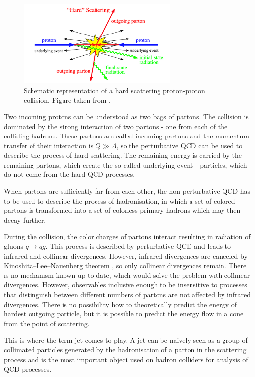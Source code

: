 \begin{figure}[t]
  \centering
  \includegraphics[width=0.7\textwidth]{Chapter2/HardProcess.png}
  \caption{Schematic representation of a hard scattering proton-proton
    collision. Figure taken from \cite{HardProcess}.}
  \label{fig:HardProcess}
\end{figure}

Two incoming protons can be understood as two bags of partons. The collision is
dominated by the strong interaction of two partons - one from each of the
colliding hadrons. These partons are called incoming partons and the
momentum transfer of their interaction is $Q \gg \Lambda$, so the perturbative
QCD can be used to describe the process of hard scattering. The remaining energy
is carried by the remaining partons, which create the so called underlying event -
particles, which do not come from the hard QCD processes.

When partons are sufficiently far from each other, the non-perturbative QCD has to
be used to describe the process of hadronisation, in which a set of colored
partons is transformed into a set of colorless primary hadrons which may then
decay further. 

During the collision, the color charges of partons interact resulting in
radiation of gluons $q \rightarrow qg$. This process is described by
perturbative QCD and leads to infrared and collinear divergences. However,
infrared divergences are
canceled by Kinoshita--Lee--Nauenberg theorem \cite{KLN1,KLN2}, so only
collinear divergences remain. There is no mechanism known up to date, which
would solve the problem with collinear divergences. However, observables
inclusive enough to be insensitive to processes that distinguish between
different numbers of partons are not affected by infrared divergences.
There is no possibility how to theoretically predict the energy of hardest
outgoing particle, but it is possible to predict the energy flow in a cone from
the point of scattering.

This is where the term jet comes to play. A jet can be naively seen as a group
of collimated particles generated by the hadronisation of a parton in the
scattering process and is the most important object used on hadron colliders for
analysis of QCD processes.

